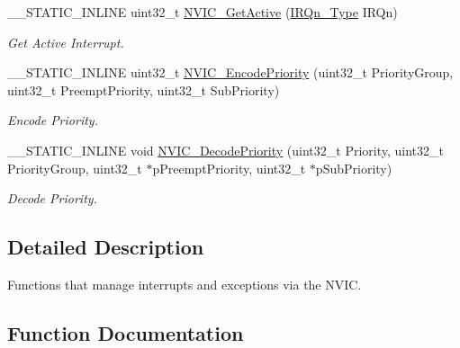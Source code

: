 \begin{DoxyCompactItemize}
\+\_\+\+\_\+\+S\+T\+A\+T\+I\+C\+\_\+\+I\+N\+L\+I\+NE uint32\+\_\+t \hyperlink{group___c_m_s_i_s___core___n_v_i_c_functions_ga47a0f52794068d076c9147aa3cb8d8a6}{N\+V\+I\+C\+\_\+\+Get\+Active} (\hyperlink{group___peripheral__interrupt__number__definition_ga7e1129cd8a196f4284d41db3e82ad5c8}{I\+R\+Qn\+\_\+\+Type} I\+R\+Qn)
\begin{DoxyCompactList}\small\item\em Get Active Interrupt. \end{DoxyCompactList}\item 
\+\_\+\+\_\+\+S\+T\+A\+T\+I\+C\+\_\+\+I\+N\+L\+I\+NE uint32\+\_\+t \hyperlink{group___c_m_s_i_s___core___n_v_i_c_functions_gadb94ac5d892b376e4f3555ae0418ebac}{N\+V\+I\+C\+\_\+\+Encode\+Priority} (uint32\+\_\+t Priority\+Group, uint32\+\_\+t Preempt\+Priority, uint32\+\_\+t Sub\+Priority)
\begin{DoxyCompactList}\small\item\em Encode Priority. \end{DoxyCompactList}\item 
\+\_\+\+\_\+\+S\+T\+A\+T\+I\+C\+\_\+\+I\+N\+L\+I\+NE void \hyperlink{group___c_m_s_i_s___core___n_v_i_c_functions_ga4f23ef94633f75d3c97670a53949003c}{N\+V\+I\+C\+\_\+\+Decode\+Priority} (uint32\+\_\+t Priority, uint32\+\_\+t Priority\+Group, uint32\+\_\+t $\ast$p\+Preempt\+Priority, uint32\+\_\+t $\ast$p\+Sub\+Priority)
\begin{DoxyCompactList}\small\item\em Decode Priority. \end{DoxyCompactList}\end{DoxyCompactItemize}


\subsection{Detailed Description}
Functions that manage interrupts and exceptions via the N\+V\+IC. 



\subsection{Function Documentation}
